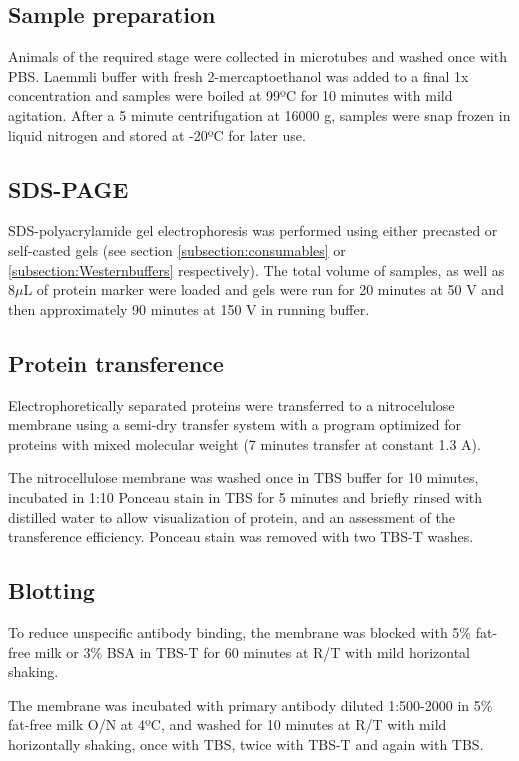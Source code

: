 \documentclass[11pt,twoside,a4paper]{report}
\begin{document}
			\subsection{Sample preparation}
			Animals of the required stage were collected in microtubes and washed once with PBS. Laemmli buffer with fresh 2-mercaptoethanol was added to a final 1x concentration and samples were boiled at 99ºC for 10 minutes with mild agitation. After a 5 minute centrifugation at 16000 g, samples were snap frozen in liquid nitrogen and stored at -20ºC for later use.
			
			\subsection{SDS-PAGE}
			SDS-polyacrylamide gel electrophoresis was performed using either precasted or self-casted gels (see section \ref{subsection:consumables} or \ref{subsection:Westernbuffers} respectively). The total volume of samples, as well as 8$\mu$L of protein marker were loaded and gels were run for 20 minutes at 50 V and then approximately 90 minutes at 150 V in running buffer.
			
			\subsection{Protein transference}
			Electrophoretically separated proteins were transferred to a nitrocelulose membrane using a semi-dry transfer system with a program optimized for proteins with mixed molecular weight (7 minutes transfer at constant 1.3 A).
			
			The nitrocellulose membrane was washed once in TBS buffer for 10 minutes, incubated in 1:10 Ponceau stain in TBS for 5 minutes and briefly rinsed with distilled water to allow visualization of protein, and an assessment of the transference efficiency. Ponceau stain was removed with two TBS-T washes.
			\subsection{Blotting}
			To reduce unspecific antibody binding, the membrane was blocked with 5\% fat-free milk or 3\% BSA in TBS-T for 60 minutes at R/T with mild horizontal shaking.
			
			The membrane was incubated with primary antibody diluted 1:500-2000 in 5\% fat-free milk O/N at 4ºC, and washed for 10 minutes at R/T with mild horizontally shaking, once with TBS, twice with TBS-T and again with TBS.
			
\end{document}
